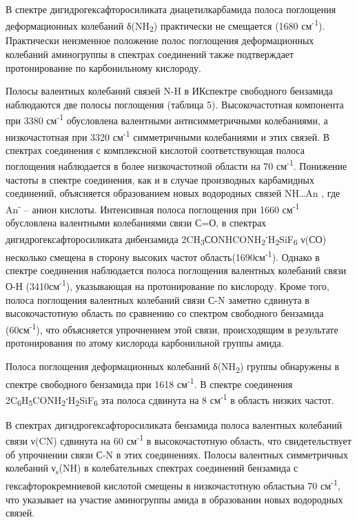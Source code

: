 В спектре дигидрогексафторосиликата диацетилкарбамида полоса поглощения
деформационных колебаний δ(NH\textsubscript{2}) практически не смещается
(1680 см\textsuperscript{-1}). Практически неизменное положение полос
поглощения деформационных колебаний аминогруппы в спектрах соединений
также подтверждает протонирование по карбонильному кислороду.

Полосы валентных колебаний связей N-H в ИКспектре свободного бензамида
наблюдаются две полосы поглощения (таблица 5). Высокочастотная
компонента при 3380 см\textsuperscript{-1} обусловлена валентными
антисимметричными колебаниями, а низкочастотная при 3320
см\textsuperscript{-1} симметричными колебаниями и этих связей. В
спектрах соединения с комплексной кислотой соответствующая полоса
поглощения наблюдается в более низкочастотной области на 70
см\textsuperscript{-1}. Понижение частоты в спектре соединения, как и в
случае производных карбамидных соединений, объясняется образованием
новых водородных связей NH\ldots An , где An\textsuperscript{-} -- анион
кислоты. Интенсивная полоса поглощения при 1660 см\textsuperscript{-1}
обусловлена валентными колебаниями связи С=О, в спектрах
дигидрогексафторосиликата дибензамида
2CH\textsubscript{3}СОNHCONH\textsubscript{2}{\bfseries \textsuperscript{.}}H\textsubscript{2}SiF\textsubscript{6}
ν(СО) несколько смещена в сторону высоких частот
область(1690см\textsuperscript{-1}). Однако в спектре соединения
наблюдается полоса поглощения валентных колебаний связи О-Н
(3410см\textsuperscript{-1}), указывающая на протонирование по
кислороду. Кроме того, полоса поглощения валентных колебаний связи С-N
заметно сдвинута в высокочастотную область по сравнению со спектром
свободного бензамида (60см\textsuperscript{-1}), что объясняется
упрочнением этой связи, происходящим в результате протонирования по
атому кислорода карбонильной группы амида.

Полоса поглощения деформационных колебаний δ(NH\textsubscript{2}) группы
обнаружены в спектре свободного бензамида при 1618
см\textsuperscript{-1}. В спектре соединения
2C\textsubscript{6}H\textsubscript{5}CONH\textsubscript{2}{\bfseries \textsuperscript{.}}H\textsubscript{2}SiF\textsubscript{6}
эта полоса сдвинута на 8 см\textsuperscript{-1} в область низких частот.

В спектрах дигидрогексафторосиликата бензамида полоса валентных
колебаний связи ν(CN) сдвинута на 60 см\textsuperscript{-1} в
высокочастотную область, что свидетельствует об упрочнении связи С-N в
этих соединениях. Полосы валентных симметричных колебаний
ν\textsubscript{s}(NH) в колебательных спектрах соединений бензамида с
гексафторокремниевой кислотой смещены в низкочастотную областьна 70
см\textsuperscript{-1}, что указывает на участие аминогруппы амида в
образовании новых водородных связей.

